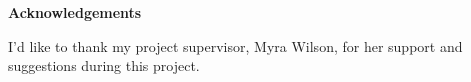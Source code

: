 \thispagestyle{empty}

\begin{center}
    {\LARGE\bf Acknowledgements}
\end{center}

I'd like to thank my project supervisor, Myra Wilson, for her support and suggestions during this project. 
